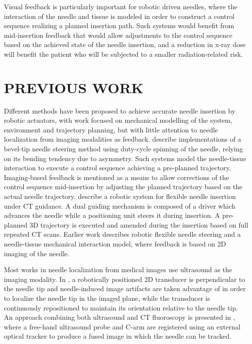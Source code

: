 \documentclass[letterpaper, 10 pt, conference]{ieeeconf}  %
\begin{document}
Visual feedback is particularly important for robotic driven needles, where the interaction of the needle and tissue is modeled in order to construct a control sequence realizing a planned insertion path. Such systems would benefit from mid-insertion feedback that would allow adjustments to the control sequence based on the achieved state of the needle insertion, and a reduction in x-ray dose will benefit the patient who will be subjected to a smaller radiation-related risk.
 
\section{PREVIOUS WORK}
Different methods have been proposed to achieve accurate needle insertion by robotic actuators, with work focused on mechanical modelling of the system, environment and trajectory planning, but with little attention to needle localization from imaging modalities as feedback.
\cite{wu2013automatic} \cite{engh2010percutaneous} describe implementations of a bevel-tip needle steering method using duty-cycle spinning of the needle, relying on its bending tendency due to asymmetry. Such systems model the needle-tissue interaction to execute a control sequence achieving a pre-planned trajectory. Imaging-based feedback is mentioned as a means to allow corrections of the control sequence mid-insertion by adjusting the planned trajectory based on the actual needle trajectory.
\cite{ben2018robotic} describe a robotic system for flexible needle insertion under CT guidance. A dual guiding mechanism is composed of a driver which advances the needle while a positioning unit steers it during insertion. A pre-planned 3D trajectory is executed and amended during the insertion based on full repeated CT scans.
Earlier work \cite{glozman2007image} describes robotic flexible needle steering and a needle-tissue mechanical interaction model, where feedback is based on 2D imaging of the needle.

Most works in needle localization from medical
images use ultrasound as the imaging modality. In \cite{vrooijink2013real}, a robotically positioned 2D transducer is perpendicular to the needle tip and needle-induced image artifacts are taken advantage of in order to localize the needle tip in the imaged plane, while the transducer is continuously repositioned to maintain its orientation relative to the needle tip. An approach combining both ultrasound and CT fluoroscopy is presented in \cite{marinetto2017integration}, where a free-hand ultrasound probe and C-arm are registered using an external optical tracker to produce a fused image in which the needle can be tracked.
\end{document}
